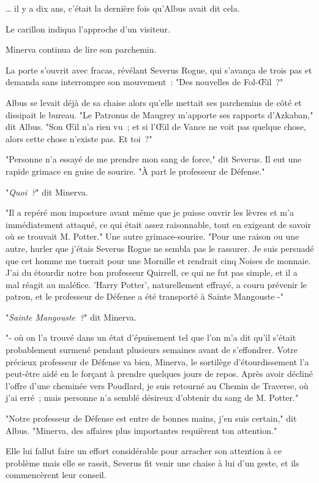 … il y a dix ans, c'était la dernière fois qu'Albus avait dit cela.

Le carillon indiqua l'approche d'un visiteur.

Minerva continua de lire son parchemin.

La porte s'ouvrit avec fracas, révélant Severus Rogue, qui s'avança de trois pas et demanda sans interrompre son mouvement~: "Des nouvelles de Fol-Œil~?"

Albus se levait déjà de sa chaise alors qu'elle mettait ses parchemins de côté et dissipait le bureau. "Le Patronus de Maugrey m'apporte ses rapports d'Azkaban," dit Albus. "Son Œil n'a rien vu~; et si l'Œil de Vance ne voit pas quelque chose, alors cette chose n'existe pas. Et toi~?"

"Personne n'a essayé de me prendre mon sang de force," dit Severus. Il eut une rapide grimace en guise de sourire. "À part le professeur de Défense."

"\emph{Quoi~?}" dit Minerva.

"Il a repéré mon imposture avant même que je puisse ouvrir les lèvres et m'a immédiatement attaqué, ce qui était assez raisonnable, tout en exigeant de savoir où se trouvait M. Potter." Une autre grimace-sourire. "Pour une raison ou une autre, hurler que j'étais Severus Rogue ne sembla pas le rassurer. Je suis persuadé que cet homme me tuerait pour une Mornille et rendrait cinq Noises de monnaie. J'ai du étourdir notre bon professeur Quirrell, ce qui ne fut pas simple, et il a mal réagit au maléfice. 'Harry Potter', naturellement effrayé, a couru prévenir le patron, et le professeur de Défense a été transporté à Sainte Mangouste -"

"\emph{Sainte Mangouste~?}" dit Minerva.

"- où on l'a trouvé dans un état d'épuisement tel que l'on m'a dit qu'il s'était probablement surmené pendant plusieurs semaines avant de s'effondrer. Votre précieux professeur de Défense va bien, Minerva, le sortilège d'étourdissement l'a peut-être aidé en le forçant à prendre quelques jours de repos. Après avoir décliné l'offre d'une cheminée vers Poudlard, je suis retourné au Chemin de Traverse, où j'ai erré~; mais personne n'a semblé désireux d'obtenir du sang de M. Potter."

"Notre professeur de Défense est entre de bonnes mains, j'en suis certain," dit Albus. "Minerva, des affaires plus importantes requièrent ton attention."

Elle lui fallut faire un effort considérable pour arracher son attention à ce problème mais elle se rassit, Severus fit venir une chaise à lui d'un geste, et ils commencèrent leur conseil.

